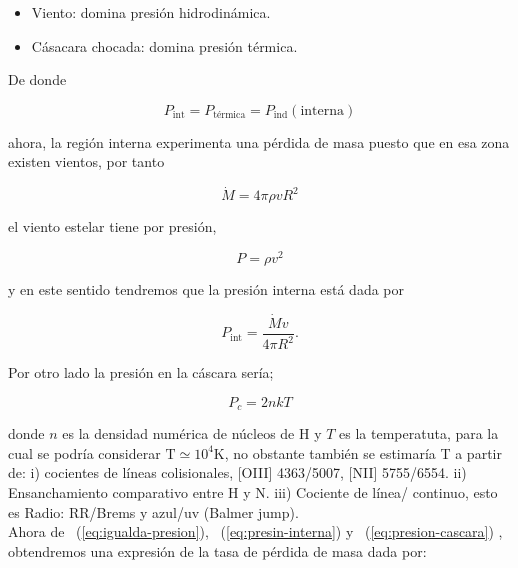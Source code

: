 \documentclass{article}
\newcommand\U[1]{\ensuremath{\mathrm{#1}}}
\newcommand\K{\U{K}}
\begin{document}
\begin{itemize}
\item  Viento: domina presión hidrodinámica.
\end{itemize}
\begin{itemize}
\item  Cásacara chocada: domina presión térmica.
\end{itemize}

 De donde 

\begin{equation}
  \label{eq:igualda-presion}
  P_{\text{int}}=P_{\text{térmica}}=P_{\text{ind}}(\text{interna})
\end{equation}

\noindent ahora, la región interna experimenta una pérdida de masa puesto que en esa zona existen vientos, por tanto

\begin{equation}
  \label{eq:perdida-masa}
  \dot{M}=4\pi \rho v R^{2}
\end{equation}

\noindent el viento estelar tiene por presión,

\begin{equation}
  \label{eq:presion-viento}
  P=\rho v^{2}
\end{equation}

\noindent y en este sentido tendremos que la presión interna está dada por  

\begin{equation}
  \label{eq:presin-interna}
  P_{\text{int}}=\frac{\dot{M} v}{4 \pi R^{2}}. 
\end{equation}

 Por otro lado la presión en la cáscara sería;

\begin{equation}
  \label{eq:presion-cascara}
  P_{c}=2 n k T 
\end{equation}

\noindent donde \(n\) es la densidad numérica de núcleos de H y \(T\) es la temperatuta, para la cual se podría considerar \(\text{T} \simeq 10^{4}\K\), no obstante también se  estimaría T a partir de: i) cocientes de líneas colisionales, [OIII] 4363/5007, [NII] 5755/6554. ii) Ensanchamiento comparativo entre H y N. iii) Cociente de línea/ continuo, esto es Radio: RR/Brems y azul/uv (Balmer jump).\\

 Ahora de ~(\ref{eq:igualda-presion}),  ~(\ref{eq:presin-interna}) y  ~(\ref{eq:presion-cascara}) , obtendremos una expresión de la tasa de pérdida de masa dada por:
\end{document}
